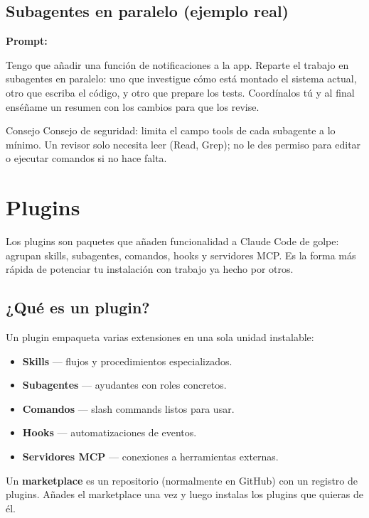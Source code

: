 \documentclass[11pt,a4paper]{report}
\begin{document}
\section{Subagentes en paralelo (ejemplo real)}

\noindent\textbf{Prompt: }
\begin{codebox}
Tengo que añadir una función de notificaciones a la app. Reparte el trabajo en subagentes en paralelo: uno que investigue cómo está montado el sistema actual, otro que escriba el código, y otro que prepare los tests. Coordínalos tú y al final enséñame un resumen con los cambios para que los revise.
\end{codebox}

\begin{calloutbox}{Consejo}
Consejo de seguridad: limita el campo tools de cada subagente a lo mínimo. Un revisor solo necesita leer (Read, Grep); no le des permiso para editar o ejecutar comandos si no hace falta.\end{calloutbox}


\chapter{Plugins}

Los plugins son paquetes que añaden funcionalidad a Claude Code de golpe: agrupan skills, subagentes, comandos, hooks y servidores MCP. Es la forma más rápida de potenciar tu instalación con trabajo ya hecho por otros.

\section{¿Qué es un plugin?}

Un plugin empaqueta varias extensiones en una sola unidad instalable:

\begin{itemize}
\item \textbf{Skills} — flujos y procedimientos especializados.
\item \textbf{Subagentes} — ayudantes con roles concretos.
\item \textbf{Comandos} — slash commands listos para usar.
\item \textbf{Hooks} — automatizaciones de eventos.
\item \textbf{Servidores MCP} — conexiones a herramientas externas.
\end{itemize}

Un \textbf{marketplace} es un repositorio (normalmente en GitHub) con un registro de plugins. Añades el marketplace una vez y luego instalas los plugins que quieras de él.
\end{document}
